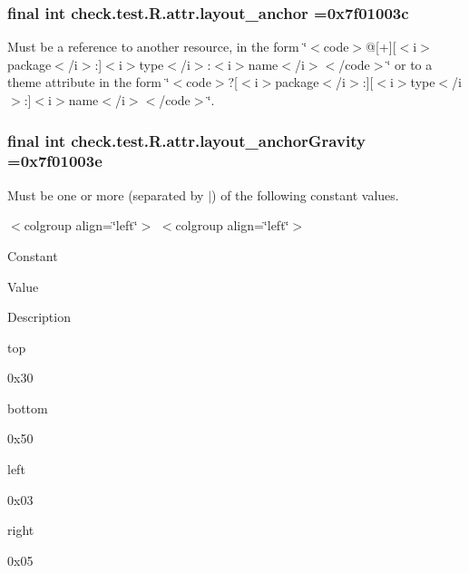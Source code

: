 \subsubsection[{layout\+\_\+anchor}]{\setlength{\rightskip}{0pt plus 5cm}final int check.\+test.\+R.\+attr.\+layout\+\_\+anchor =0x7f01003c\hspace{0.3cm}{\ttfamily [static]}}\label{classcheck_1_1test_1_1_r_1_1attr_a513151f8e3655d179db3b9e843eb2099}
Must be a reference to another resource, in the form \char`\"{}$<$code$>$@\mbox{[}+\mbox{]}\mbox{[}$<$i$>$package$<$/i$>$\+:\mbox{]}$<$i$>$type$<$/i$>$\+:$<$i$>$name$<$/i$>$$<$/code$>$\char`\"{} or to a theme attribute in the form \char`\"{}$<$code$>$?\mbox{[}$<$i$>$package$<$/i$>$\+:\mbox{]}\mbox{[}$<$i$>$type$<$/i$>$\+:\mbox{]}$<$i$>$name$<$/i$>$$<$/code$>$\char`\"{}. \hypertarget{classcheck_1_1test_1_1_r_1_1attr_af02d49a287ddff50432bf16e0579f4b0}{}
\subsubsection[{layout\+\_\+anchor\+Gravity}]{\setlength{\rightskip}{0pt plus 5cm}final int check.\+test.\+R.\+attr.\+layout\+\_\+anchor\+Gravity =0x7f01003e\hspace{0.3cm}{\ttfamily [static]}}\label{classcheck_1_1test_1_1_r_1_1attr_af02d49a287ddff50432bf16e0579f4b0}
Must be one or more (separated by \textquotesingle{}$\vert$\textquotesingle{}) of the following constant values.

\begin{TabularC}{0}
\hline
\end{TabularC}
$<$colgroup align=\char`\"{}left\char`\"{}$>$ $<$colgroup align=\char`\"{}left\char`\"{}$>$ 

Constant

Value

Description 

{\ttfamily top}

0x30

{\ttfamily bottom}

0x50

{\ttfamily left}

0x03

{\ttfamily right}

0x05

